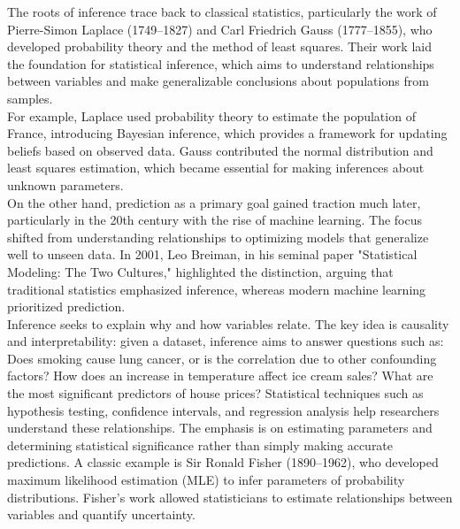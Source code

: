 \documentclass{book}
\begin{document}
The roots of inference trace back to classical statistics, particularly the work of Pierre-Simon Laplace (1749–1827) and Carl Friedrich Gauss (1777–1855), who developed probability theory and the method of least squares. Their work laid the foundation for statistical inference, which aims to understand relationships between variables and make generalizable conclusions about populations from samples.\\

For example, Laplace used probability theory to estimate the population of France, introducing Bayesian inference, which provides a framework for updating beliefs based on observed data. Gauss contributed the normal distribution and least squares estimation, which became essential for making inferences about unknown parameters.\\

On the other hand, prediction as a primary goal gained traction much later, particularly in the 20th century with the rise of machine learning. The focus shifted from understanding relationships to optimizing models that generalize well to unseen data. In 2001, Leo Breiman, in his seminal paper "Statistical Modeling: The Two Cultures," highlighted the distinction, arguing that traditional statistics emphasized inference, whereas modern machine learning prioritized prediction.\\

Inference seeks to explain why and how variables relate. The key idea is causality and interpretability: given a dataset, inference aims to answer questions such as: Does smoking cause lung cancer, or is the correlation due to other confounding factors? How does an increase in temperature affect ice cream sales? What are the most significant predictors of house prices? Statistical techniques such as hypothesis testing, confidence intervals, and regression analysis help researchers understand these relationships. The emphasis is on estimating parameters and determining statistical significance rather than simply making accurate predictions. A classic example is Sir Ronald Fisher (1890–1962), who developed maximum likelihood estimation (MLE) to infer parameters of probability distributions. Fisher’s work allowed statisticians to estimate relationships between variables and quantify uncertainty.\\
\end{document}
